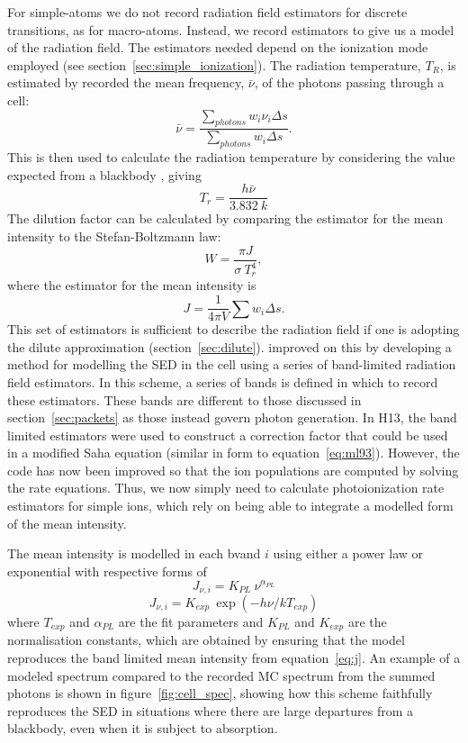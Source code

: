 For simple-atoms we do not record radiation field estimators for discrete 
transitions, as for macro-atoms. Instead, we record estimators to
give us a model of the radiation field. The estimators needed
depend on the ionization mode employed (see section~\ref{sec:simple_ionization}).
The radiation temperature, $T_R$, is estimated by recorded the mean frequency, 
$\bar{\nu}$, of the photons passing through a cell:
\begin{equation}
\bar{\nu} = \frac{\sum_{photons} w_i \nu_i \Delta s}{\sum_{photons} w_i \Delta s}.
\end{equation}
This is then used to calculate the radiation temperature by
considering the value expected from a blackbody \cite{ML93}, giving 
\begin{equation}
T_r = \frac{h\bar{\nu}}{3.832~k}
\end{equation}
The dilution factor can be calculated by comparing the estimator for the mean intensity 
to the Stefan-Boltzmann law:
\begin{equation}
W = \frac{\pi J}{\sigma~T_r^4},
\end{equation}
where the estimator for the mean intensity is
\begin{equation}
J = \frac{1}{4\pi V} \sum w_i \Delta s.
\label{eq:j}
\end{equation}
This set of estimators is sufficient to describe the 
radiation field if one is adopting the dilute approximation (section~\ref{sec:dilute}).
\cite{higginbottom2013} improved on this by developing a method for
modelling the SED in the cell using a series of band-limited 
radiation field estimators. In this scheme, a series of bands is defined
in which to record these estimators. These bands are different to those
discussed in section~\ref{sec:packets} as those instead govern photon generation.
In H13, the band limited estimators were used to construct a correction factor
that could be used in a modified Saha equation 
(similar in form to equation~\ref{eq:ml93}). However, the code has now been
improved so that the ion populations are computed by solving the rate equations.
Thus, we now simply need to calculate photoionization rate estimators for simple 
ions, which rely on being able to integrate a modelled form of the mean intensity.

The mean intensity is modelled in each bvand $i$ using either a power law or exponential
with respective forms of
\begin{equation}
J_{\nu,i} = K_{PL}~ \nu^{\alpha_{PL}}
\end{equation}
\begin{equation}
J_{\nu,i} = K_{exp}~ \exp(-h\nu / k T_{exp})
\end{equation}
where $T_{exp}$ and $\alpha_{PL}$ are the fit parameters and $K_{PL}$ and $K_{exp}$ 
are the normalisation constants, which are obtained by ensuring that
the model reproduces the band limited mean intensity from equation~\ref{eq:j}.
An example of a modeled spectrum compared to the recorded MC spectrum from
the summed photons is shown in figure~\ref{fig:cell_spec}, showing how
this scheme faithfully reproduces the SED in situations where there are large departures
from a blackbody, even when it is subject to absorption. 

